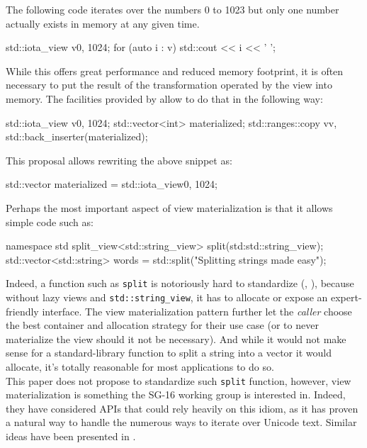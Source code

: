 \documentclass{wg21}
\newcommand{\cc}[1]{\texttt{#1}}
\begin{document}
The following code iterates over the numbers 0 to 1023 but only one number actually exists in memory at any given time.
\begin{codeblock}
std::iota_view v{0, 1024};
for (auto i : v) {
    std::cout << i << ' ';
}
\end{codeblock}

While this offers great performance and reduced memory footprint, it is often necessary to put the result of the transformation operated by the view into memory.
The facilities provided by \cite{P0896R3} allow to do that in the following way:


\begin{codeblock}
    std::iota_view v{0, 1024};
    std::vector<int> materialized;
    std::ranges::copy v{v, std::back_inserter(materialized)};
\end{codeblock}

This proposal allows rewriting the above snippet as:

\begin{codeblock}
    std::vector materialized = std::iota_view{0, 1024};
\end{codeblock}


Perhaps the most important aspect of view materialization is that it allows simple code such as:

\begin{codeblock}
    namespace std {
        split_view<std::string_view> split(std:std::string_view);
    }
    std::vector<std::string> words = std::split("Splitting strings made easy");
\end{codeblock}

Indeed, a function such as \cc{split} is notoriously hard to standardize (\cite{P0540},  \cite{N3593}), because without lazy views and \cc{std::string_view}, it has to allocate or expose an expert-friendly interface.
The view materialization pattern further let the \emph{caller} choose the best container and allocation strategy for their use case (or to never materialize the view should it not be necessary).
And while it would not make sense for a standard-library function to split a string into a vector it would allocate, it's totally reasonable for most applications to do so.\\

This paper does not propose to standardize such \cc{split} function, however, view materialization is something the SG-16 working group is interested in.
Indeed, they have considered APIs that could rely heavily on this idiom, as it has proven a natural way to handle the numerous ways to iterate over Unicode text.
Similar ideas have been presented in \cite{P1004}.
\end{document}
